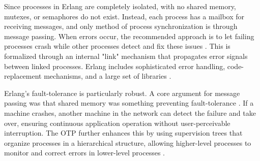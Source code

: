 \documentclass[]{interim}
\begin{document}
Since processes in Erlang are completely isolated, with no shared memory, mutexes,
or semaphores do not exist. Instead, each process has a mailbox for receiving messages,
and only method of process synchronization is through message passing.
When errors occur, the recommended approach is to let failing processes
crash while other processes detect and fix these issues \cite{armstrong_erlang_2010}.
This is formalized
through an internal "link" mechanism that propagates error signals between
linked processes. Erlang includes sophisticated error handling, code-replacement
mechanisms, and a large set of libraries \cite{armstrong_erlang_2010}.

Erlang's fault-tolerance is particularly robust.
A core argument for message passing was that shared memory was something
preventing fault-tolerance \cite{armstrong_erlang_2010}.
If a machine crashes, another
machine in the network can detect the failure and take over, ensuring continuous
application operation without user-perceivable interruption. The OTP further
enhances this by using supervision trees that
organize processes in a hierarchical structure, allowing higher-level processes
to monitor and correct errors in lower-level processes \cite{armstrong_erlang_2010}.
\end{document}
